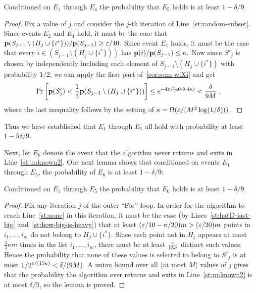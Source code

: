 \begin{lemma} \label{lem:S'j-heavy}
Conditioned on $E_1$ through $E_4$ the probability that
$E_5$ holds is at least
$1 - \delta/9$.
\end{lemma}


\begin{proof}
Fix a value of $j$ and consider the $j$-th iteration of
Line~\ref{st:random-subset}. Since events $E_2$ and $E_4$ hold,
it must be the case that
$\mathbf{p}(S_{j-1} \setminus (H_{j} \cup \{i^\ast\}))/\mathbf{p}(S_{j-1}) \geq \varepsilon/40.$
Since event $E_1$ holds, it must be the case that every
$i \in (S_{j-1} \setminus (H_{j} \cup \{i^\ast\}))$ has
$\mathbf{p}(i)/\mathbf{p}(S_{j-1}) \leq \kappa.$
Now since $S'_{j}$ is chosen by independently including each
element of $S_{j-1} \setminus (H_{j} \cup \{i^\ast\})$
with probability $1/2$,
{we can apply the first part of~\cref{cor:sum-wiXi}
and get
\[
\Pr\left[\mathbf{p}(S'_j) <
{\frac{1}3}\mathbf{p}(S_{j-1} \setminus (H_{j} \cup \{i^\ast\}))\right]
\leq e^{-4\varepsilon/(40\cdot 9\cdot 4 \kappa)} < \frac{\delta}{9M}\;,
\]
where the last inequality follows by the setting of
$\kappa = \Omega(\varepsilon/(M^2 \log(1/\delta)))$.
}
\end{proof}

Thus we have established that $E_1$ through $E_5$ all hold with probability
at least $1 - 5\delta/9$.

Next, let $E_{6}$ denote the event that the algorithm never returns
\unknown and exits in Line~\ref{st:unknown2}.  Our next lemma shows
that conditioned on events $E_1$ through $E_5$, the probability
of $E_{6}$ is at least $1-\delta/9$:

\begin{lemma} \label{lem:no-exit-unknown2}
Conditioned on $E_1$ through $E_5$ the probability that $E_{6}$ holds is at
least $1-\delta/9$.
\end{lemma}
\begin{proof}
Fix any iteration $j$ of the outer ``For'' loop.  In order
for the algorithm to reach Line~\ref{st:none} in this iteration,
it must be the case (by Lines~\ref{st:hatD-iast-big}
and~\ref{st:how-big-is-heavy}) that at least $(\varepsilon/10 - \kappa/20)m
> (\varepsilon/20)m$ points in $i_1,\dots,i_m$ do not belong to $H_{j} \cup
\{i^\ast\}.$  Since each point not in $H_{j}$ appears at most ${\frac 3 4}
\kappa m$ times in the list $i_1,\dots,i_m$, there must
be at least ${\frac{\varepsilon}{15 \kappa}}$ distinct such values.
Hence the probability that none of these values is selected to
belong to $S'_j$ is at most $1/2^{\varepsilon/(15 \kappa)} <
\delta/(9M).$ A union bound over all (at most $M$) values of $j$
gives that the probability the algorithm ever returns \unknown and
exits in Line~\ref{st:unknown2} is at most $\delta/9$,
so the lemma is proved.
\end{proof}

